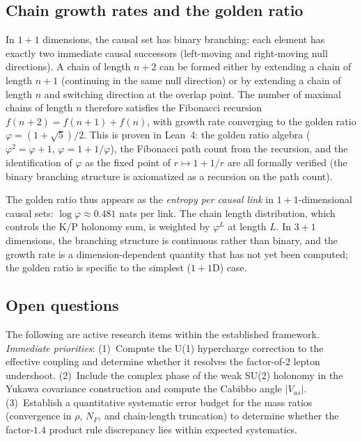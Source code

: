 \documentclass[12pt,a4paper]{article}
\begin{document}
\subsection{Chain growth rates and the golden ratio}

In $1{+}1$ dimensions, the causal set has binary branching: each element has exactly two immediate causal successors (left-moving and right-moving null directions).  A chain of length $n{+}2$ can be formed either by extending a chain of length $n{+}1$ (continuing in the same null direction) or by extending a chain of length $n$ and switching direction at the overlap point.  The number of maximal chains of length $n$ therefore satisfies the Fibonacci recursion $f(n{+}2) = f(n{+}1) + f(n)$, with growth rate converging to the golden ratio $\varphi = (1 + \sqrt{5})/2$.  This is proven in Lean~4: the golden ratio algebra ($\varphi^2 = \varphi + 1$, $\varphi = 1 + 1/\varphi$), the Fibonacci path count from the recursion, and the identification of $\varphi$ as the fixed point of $r \mapsto 1 + 1/r$ are all formally verified (the binary branching structure is axiomatized as a recursion on the path count).

The golden ratio thus appears as the \emph{entropy per causal link} in $1{+}1$-dimensional causal sets: $\log\varphi \approx 0.481$ nats per link.  The chain length distribution, which controls the K/P holonomy sum, is weighted by $\varphi^L$ at length $L$.  In $3{+}1$ dimensions, the branching structure is continuous rather than binary, and the growth rate is a dimension-dependent quantity that has not yet been computed; the golden ratio is specific to the simplest ($1{+}1$D) case.

\subsection{Open questions}
\label{sec:open}

The following are active research items within the established framework.  \emph{Immediate priorities}: (1)~Compute the U(1) hypercharge correction to the effective coupling and determine whether it resolves the factor-of-2 lepton undershoot.  (2)~Include the complex phase of the weak SU(2) holonomy in the Yukawa covariance construction and compute the Cabibbo angle $|V_{us}|$.  (3)~Establish a quantitative systematic error budget for the mass ratios (convergence in $\rho$, $N_F$, and chain-length truncation) to determine whether the factor-$1.4$ product rule discrepancy lies within expected systematics.
\end{document}
